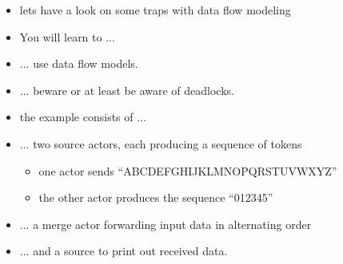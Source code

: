 \begin{frame}
\begin{itemize}
\item lets have a look on some traps with data flow modeling
\end{itemize}
\begin{itemize}
\item You will learn to ...
\item ... use data flow models.
\item ... beware or at least be aware of deadlocks.
\end{itemize}
\end{frame}







\begin{frame}
\begin{figure}
\centering
\resizebox{0.9\columnwidth}{!}{}
\end{figure}
\begin{itemize}
\item the example consists of ...
\item ... two source actors, each producing a sequence of tokens
\begin{itemize}
\item one actor sends ``ABCDEFGHIJKLMNOPQRSTUVWXYZ''
\item the other actor produces the sequence ``012345''
\end{itemize}
\item ... a merge actor forwarding input data in alternating order
\item ... and a source to print out received data.
\end{itemize}
\end{frame}





